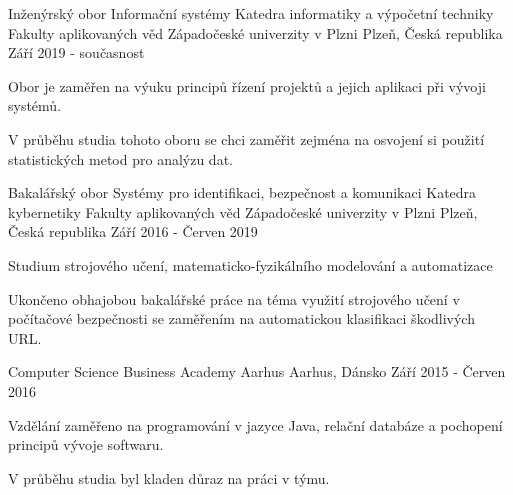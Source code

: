 

\begin{cventries}

    \cventry
    {Inženýrský obor Informační systémy} %
    {Katedra informatiky a výpočetní techniky Fakulty aplikovaných věd Západočeské univerzity v Plzni} %
    {Plzeň, Česká republika} %
    {Září 2019 - současnost} %
    {
      \begin{cvitems} %
        \item {Obor je zaměřen na výuku principů řízení projektů a jejich aplikaci při vývoji systémů.}
        \item {V průběhu studia tohoto oboru se chci zaměřit zejména na osvojení si použití statistických metod pro analýzu dat.}
      \end{cvitems}
    }

    \cventry
    {Bakalářský obor Systémy pro identifikaci, bezpečnost a komunikaci} %
    {Katedra kybernetiky Fakulty aplikovaných věd Západočeské univerzity v Plzni} %
    {Plzeň, Česká republika} %
    {Září 2016 - Červen 2019} %
    {
      \begin{cvitems} %
        \item {Studium strojového učení, matematicko-fyzikálního modelování a automatizace}
        \item {Ukončeno obhajobou bakalářské práce na téma využití strojového učení v počítačové bezpečnosti se zaměřením na automatickou klasifikaci škodlivých URL.}
      \end{cvitems}
    }

    \cventry
    {Computer Science}
    {Business Academy Aarhus}
    {Aarhus, Dánsko}
    {Září 2015 - Červen 2016}
    {
      \begin{cvitems}
        \item {Vzdělání zaměřeno na programování v jazyce Java, relační databáze a pochopení principů vývoje softwaru.}
        \item {V průběhu studia byl kladen důraz na práci v týmu.}
      \end{cvitems}
    }


\end{cventries}
